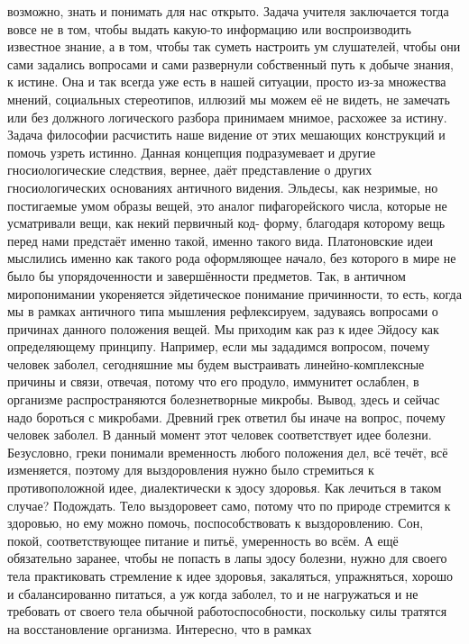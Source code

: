 возможно, знать и понимать для нас открыто. Задача учителя заключается тогда
вовсе не в том, чтобы выдать какую-то информацию или воспроизводить известное
знание, а в том, чтобы так суметь настроить ум слушателей, чтобы они сами
задались вопросами и сами развернули собственный путь к добыче знания, к истине.
Она и так всегда уже есть в нашей ситуации, просто из-за множества мнений,
социальных стереотипов, иллюзий мы можем её не видеть, не замечать или без
должного логического разбора принимаем мнимое, расхожее за истину. Задача
философии расчистить наше видение от этих мешающих конструкций и помочь узреть
истинно. Данная концепция подразумевает и другие гносиологические следствия,
вернее, даёт представление о других гносиологических основаниях античного
видения. Эльдесы, как незримые, но постигаемые умом образы вещей, это аналог
пифагорейского числа, которые не усматривали вещи, как некий первичный код-
форму, благодаря которому вещь перед нами предстаёт именно такой, именно такого
вида. Платоновские идеи мыслились именно как такого рода оформляющее начало, без
которого в мире не было бы упорядоченности и завершённости предметов. Так, в
античном миропонимании укореняется эйдетическое понимание причинности, то есть,
когда мы в рамках античного типа мышления рефлексируем, задуваясь вопросами о
причинах данного положения вещей. Мы приходим как раз к идее Эйдосу как
определяющему принципу. Например, если мы зададимся вопросом, почему человек
заболел, сегодняшние мы будем выстраивать линейно-комплексные причины и связи,
отвечая, потому что его продуло, иммунитет ослаблен, в организме
распространяются болезнетворные микробы. Вывод, здесь и сейчас надо бороться с
микробами. Древний грек ответил бы иначе на вопрос, почему человек заболел. В
данный момент этот человек соответствует идее болезни. Безусловно, греки
понимали временность любого положения дел, всё течёт, всё изменяется, поэтому
для выздоровления нужно было стремиться к противоположной идее, диалектически к
эдосу здоровья. Как лечиться в таком случае? Подождать. Тело выздоровеет само,
потому что по природе стремится к здоровью, но ему можно помочь,
поспособствовать к выздоровлению. Сон, покой, соответствующее питание и питьё,
умеренность во всём. А ещё обязательно заранее, чтобы не попасть в лапы эдосу
болезни, нужно для своего тела практиковать стремление к идее здоровья,
закаляться, упражняться, хорошо и сбалансированно питаться, а уж когда заболел,
то и не нагружаться и не требовать от своего тела обычной работоспособности,
поскольку силы тратятся на восстановление организма. Интересно, что в рамках
